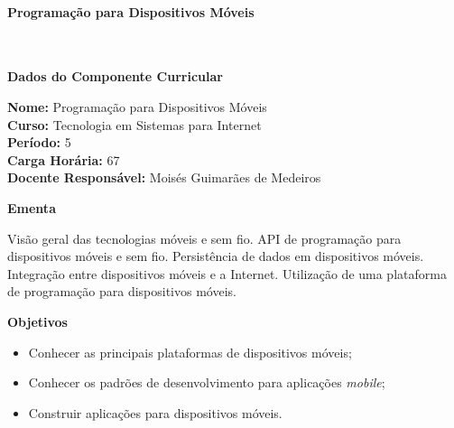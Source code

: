 \paragraph{Programação para Dispositivos Móveis} \


\begin{snugshade}\begin{center}\textbf{
    Dados do Componente Curricular
}\end{center}\end{snugshade}

\noindent \textbf{Nome:}                Programação para Dispositivos Móveis
\\        \textbf{Curso:}               Tecnologia em Sistemas para Internet
\\        \textbf{Período:}             \unit{5}{\degree}
\\        \textbf{Carga Horária:}       \unit{67}{\hour}
\\        \textbf{Docente Responsável:} Moisés Guimarães de Medeiros


\begin{snugshade}\begin{center}\textbf{
    Ementa
\vphantom{q}}\end{center}\end{snugshade}

\noindent
Visão geral das tecnologias móveis e sem fio. API de programação para dispositivos móveis e sem fio. Persistência de dados em dispositivos móveis. Integração entre dispositivos móveis e a Internet. Utilização de uma plataforma de programação para dispositivos móveis.


\begin{snugshade}\begin{center}\textbf{
    Objetivos
}\end{center}\end{snugshade}

\begin{itemize}

\item Conhecer as principais plataformas de dispositivos móveis;

\item Conhecer os padrões de desenvolvimento para aplicações \textit{mobile};

\item Construir aplicações para dispositivos móveis.

\end{itemize}

